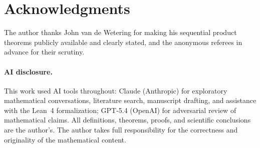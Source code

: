 \documentclass[11pt]{article}
\begin{document}








\section*{Acknowledgments}

The author thanks John van de Wetering for making his sequential
product theorems publicly available and clearly stated, and the
anonymous referees in advance for their scrutiny.

\paragraph{AI disclosure.}
This work used AI tools throughout: Claude (Anthropic) for
exploratory mathematical conversations, literature search, manuscript
drafting, and assistance with the Lean~4 formalization; GPT-5.4
(OpenAI) for adversarial review of mathematical claims.  All
definitions, theorems, proofs, and scientific conclusions are the
author's.  The author takes full responsibility for the correctness
and originality of the mathematical content.


\appendix








\end{document}
